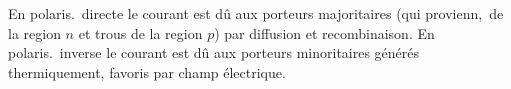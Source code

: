 En polaris.\ directe le courant est dû aux porteurs majoritaires (\elec qui provienn,\ de la region $n$ et trous de la region $p$) par diffusion et recombinaison.
En polaris.\ inverse le courant est dû aux porteurs minoritaires générés thermiquement, favoris par champ électrique.